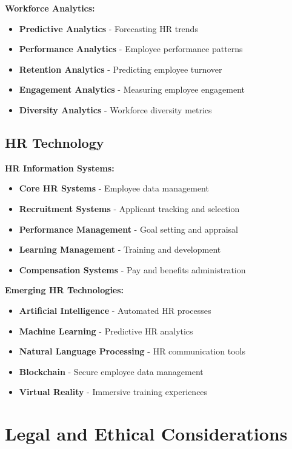 \documentclass[12pt]{article}
\begin{document}
\textbf{Workforce Analytics:}
\begin{itemize}
    \item \textbf{Predictive Analytics} - Forecasting HR trends
    \item \textbf{Performance Analytics} - Employee performance patterns
    \item \textbf{Retention Analytics} - Predicting employee turnover
    \item \textbf{Engagement Analytics} - Measuring employee engagement
    \item \textbf{Diversity Analytics} - Workforce diversity metrics
\end{itemize}

\subsection{HR Technology}

\textbf{HR Information Systems:}
\begin{itemize}
    \item \textbf{Core HR Systems} - Employee data management
    \item \textbf{Recruitment Systems} - Applicant tracking and selection
    \item \textbf{Performance Management} - Goal setting and appraisal
    \item \textbf{Learning Management} - Training and development
    \item \textbf{Compensation Systems} - Pay and benefits administration
\end{itemize}

\textbf{Emerging HR Technologies:}
\begin{itemize}
    \item \textbf{Artificial Intelligence} - Automated HR processes
    \item \textbf{Machine Learning} - Predictive HR analytics
    \item \textbf{Natural Language Processing} - HR communication tools
    \item \textbf{Blockchain} - Secure employee data management
    \item \textbf{Virtual Reality} - Immersive training experiences
\end{itemize}

\section{Legal and Ethical Considerations}
\end{document}
